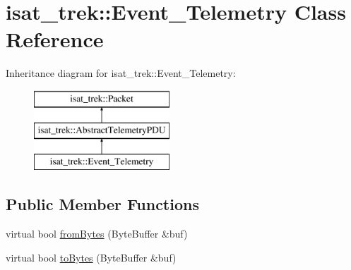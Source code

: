 \hypertarget{classisat__trek_1_1_event___telemetry}{}\section{isat\+\_\+trek\+:\+:Event\+\_\+\+Telemetry Class Reference}
\label{classisat__trek_1_1_event___telemetry}
Inheritance diagram for isat\+\_\+trek\+:\+:Event\+\_\+\+Telemetry\+:\begin{figure}[H]
\begin{center}
\leavevmode
\includegraphics[height=3.000000cm]{classisat__trek_1_1_event___telemetry}
\end{center}
\end{figure}
\subsection*{Public Member Functions}
\begin{DoxyCompactItemize}
\item 
virtual bool \hyperlink{classisat__trek_1_1_event___telemetry_aeea8da6424ee67eec4783cf53fcce4ca}{from\+Bytes} (Byte\+Buffer \&buf)
\item 
virtual bool \hyperlink{classisat__trek_1_1_event___telemetry_aedaa07bcddc941db908689f3289213e5}{to\+Bytes} (Byte\+Buffer \&buf)
\end{DoxyCompactItemize}
